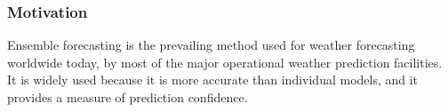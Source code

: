 \documentclass[../paper.tex]{subfiles}
\begin{document}
    \subsubsection{Motivation}
        Ensemble forecasting is the prevailing method used for weather forecasting worldwide today, by most of the major operational weather prediction facilities.
        It is widely used because it is more accurate than individual models, and it provides a measure of prediction confidence.
\end{document}
